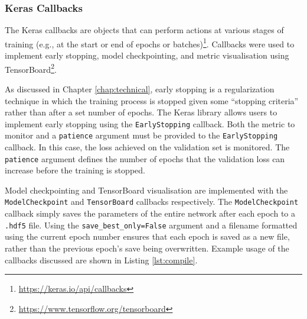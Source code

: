 \subsubsection{Keras Callbacks}

The Keras callbacks are objects that can perform actions at various stages of training (e.g., at the start or end of epochs or batches)\footnote{\url{https://keras.io/api/callbacks}}. Callbacks were used to implement early stopping, model checkpointing, and metric visualisation using TensorBoard\footnote{\url{https://www.tensorflow.org/tensorboard}}.

As discussed in Chapter \ref{chap:technical}, early stopping is a regularization technique in which the training process is stopped given some ``stopping criteria'' rather than after a set number of epochs. The Keras library allows users to implement early stopping using the \texttt{EarlyStopping} callback. Both the metric to monitor and a \texttt{patience} argument must be provided to the \texttt{EarlyStopping} callback. In this case, the loss achieved on the validation set is monitored. The \texttt{patience} argument defines the number of epochs that the validation loss can increase before the training is stopped.

Model checkpointing and TensorBoard visualisation are implemented with the \texttt{ModelCheckpoint} and \texttt{TensorBoard} callbacks respectively. The \texttt{ModelCheckpoint} callback simply saves the parameters of the entire network after each epoch to a \texttt{.hdf5} file. Using the \texttt{save\_best\_only=False} argument and a filename formatted using the current epoch number ensures that each epoch is saved as a new file, rather than the previous epoch's save being overwritten. Example usage of the callbacks discussed are shown in Listing \ref{lst:compile}.

